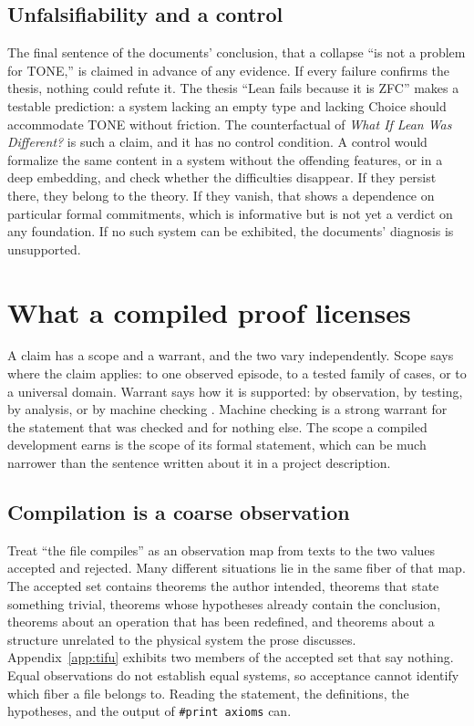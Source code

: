 \documentclass[11pt]{article}
\begin{document}
\subsection{Unfalsifiability and a control}

The final sentence of the documents' conclusion, that a collapse ``is not a problem for TONE,'' is claimed in advance of any evidence. If every failure confirms the thesis, nothing could refute it. The thesis ``Lean fails because it is ZFC'' makes a testable prediction: a system lacking an empty type and lacking Choice should accommodate TONE without friction. The counterfactual of \emph{What If Lean Was Different?} is such a claim, and it has no control condition. A control would formalize the same content in a system without the offending features, or in a deep embedding, and check whether the difficulties disappear. If they persist there, they belong to the theory. If they vanish, that shows a dependence on particular formal commitments, which is informative but is not yet a verdict on any foundation. If no such system can be exhibited, the documents' diagnosis is unsupported.

\section{What a compiled proof licenses}
\label{sec:licenses}

A claim has a scope and a warrant, and the two vary independently. Scope says where the claim applies: to one observed episode, to a tested family of cases, or to a universal domain. Warrant says how it is supported: by observation, by testing, by analysis, or by machine checking \cite{flyxion2026adv,flyxion2026deg}. Machine checking is a strong warrant for the statement that was checked and for nothing else. The scope a compiled development earns is the scope of its formal statement, which can be much narrower than the sentence written about it in a project description.

\subsection{Compilation is a coarse observation}

Treat ``the file compiles'' as an observation map from texts to the two values accepted and rejected. Many different situations lie in the same fiber of that map. The accepted set contains theorems the author intended, theorems that state something trivial, theorems whose hypotheses already contain the conclusion, theorems about an operation that has been redefined, and theorems about a structure unrelated to the physical system the prose discusses. Appendix~\ref{app:tifu} exhibits two members of the accepted set that say nothing. Equal observations do not establish equal systems, so acceptance cannot identify which fiber a file belongs to. Reading the statement, the definitions, the hypotheses, and the output of \texttt{\#print axioms} can.
\end{document}
